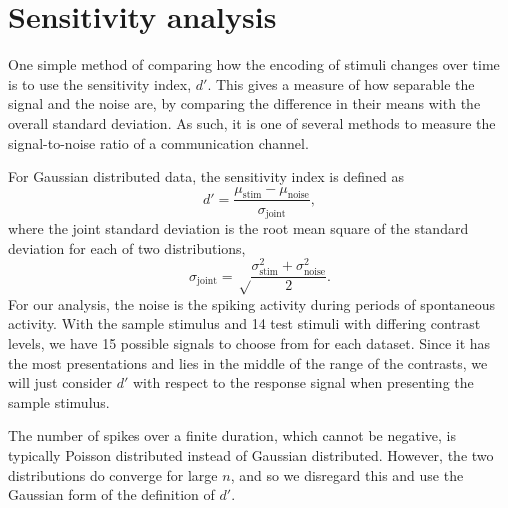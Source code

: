 \section{Sensitivity analysis}
\label{sec:pl_dprime}

One simple method of comparing how the encoding of stimuli changes over time is to use the sensitivity index, $d'$.
This gives a measure of how separable the signal and the noise are, by comparing the difference in their means with the overall standard deviation.
As such, it is one of several methods to measure the signal-to-noise ratio of a communication channel.

For Gaussian distributed data, the sensitivity index is defined as
\begin{equation}
\label{eq:dprime}
d' = \frac{\mu_\text{stim} - \mu_\text{noise}}{\sigma_\text{joint}}
,\end{equation}
where the joint standard deviation is the root mean square of the standard deviation for each of two distributions,
\begin{equation}
\sigma_\text{joint} = \sqrt \frac{\sigma_\text{stim}^2 + \sigma_\text{noise}^2}{2}
.\end{equation}
For our analysis, the noise is the spiking activity during periods of spontaneous activity.
With the sample stimulus and \num{14} test stimuli with differing contrast levels, we have \num{15} possible signals to choose from for each dataset.
Since it has the most presentations and lies in the middle of the range of the contrasts, we will just consider $d'$ with respect to the response signal when presenting the sample stimulus.

The number of spikes over a finite duration, which cannot be negative, is typically Poisson distributed instead of Gaussian distributed.
However, the two distributions do converge for large $n$, and so we disregard this and use the Gaussian form of the definition of $d'$.

